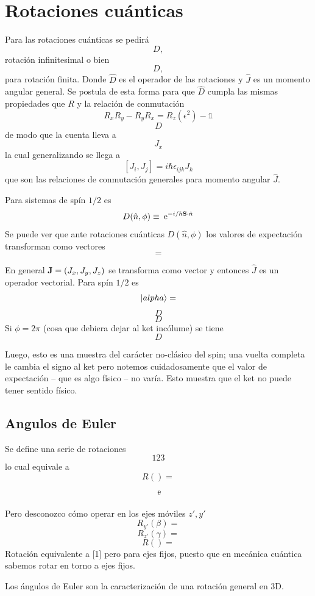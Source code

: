 \documentclass[10pt,oneside]{CBFT_book}
\begin{document}
\section{Rotaciones cuánticas}

Para las rotaciones cuánticas se pedirá
\[
	D,
\]
rotación infinitesimal o bien
\[
	D,
\]
para rotación finita. Donde $\hat{D}$ es el operador de las rotaciones y $\hat{J}$ es un momento angular 
general. Se postula de esta forma para que $\hat{D}$ cumpla las mismas propiedades que $R$ y la relación de 
conmutación
\[
	R_x R_y - R_y R_x = R_z (\epsilon^2) - \mathbb{1}
\]
\[
	D
\]
de modo que la cuenta lleva a  
\[
	J_x
\]
la cual generalizando se llega a 
\[
	[J_i,J_j] = i \hbar \epsilon_{ijk} J_k
\]
que son las relaciones de conmutación generales para momento angular $\hat{J}$.

Para sistemas de spín $1/2$ es 
\[
	D(\hat{n},\phi) \equiv \euler^{-i/\hbar \vb{S}\cdot\hat{n} }
\]
Se puede ver que ante rotaciones cuánticas $D(\hat{n},\phi)$ los valores de expectación transforman como 
vectores
\[
	=
\]

En general $\vb{J} = (J_x, J_y, J_z)$ se transforma como vector y entonces $\hat{J}$ es un operador vectorial.
Para spín $1/2$ es
\[
	\Ket{alpha} =
\]
\[
	D
\]
\[
	D
\]
Si $\phi=2\pi$ (cosa que debiera dejar al ket incólume) se tiene 
\[
	D
\]

Luego, esto es una muestra del carácter no-clásico del spin; una vuelta completa le cambia el signo al ket 
pero notemos cuidadosamente que el valor de expectación -- que es algo físico -- no varía. Esto muestra que 
el ket no puede tener sentido físico.

\subsection{Angulos de Euler}

Se define una serie de rotaciones 
\[
	1 2 3
\]
lo cual equivale a
\[
	R() = 
\]
\[
	\:\mathrm{e}
\]

Pero desconozco cómo operar en los ejes móviles $z',y'$
\[
	R_{y'}(\beta) =
\]
\[
	R_{z'}(\gamma) =
\]
\[
	R() =
\]
Rotación equivalente a [1] pero para ejes fijos, puesto que en mecánica cuántica sabemos rotar en torno a 
ejes fijos.

Los ángulos de Euler son la caracterización de una rotación general en 3D.
\end{document}
